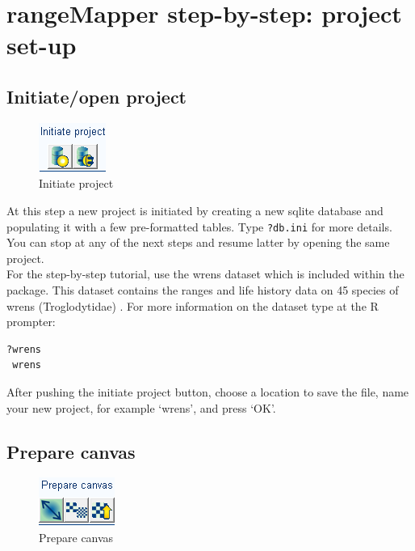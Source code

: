 \documentclass[ a4paper ]{article}
\newenvironment{Rcode}
{\begin{list}{}{\setlength{\leftmargin}{1em}}\item\scriptsize\bfseries}
{\end{list}}
\begin{document}
 \pagebreak	
\section{rangeMapper step-by-step: project set-up}
	\subsection{Initiate/open project}

	\begin{figure}[htbp]
	  \begin{center}
		\includegraphics[width=0.2\linewidth]{fig3}
		\caption{\label{fig:fig3} Initiate project}
	  \end{center}
	\end{figure}

	At this step a new project is initiated by creating a new sqlite database and populating it with a few pre-formatted tables. 
	Type \texttt{?db.ini} for more details. You can stop at any of the next steps and resume latter by opening the same project.
	\\
	For the step-by-step tutorial, use the wrens dataset which is included within the package. This dataset contains the ranges and life history data on 45 species of wrens (Troglodytidae) \cite{ridgely07}. 
For more information on the dataset type at the R prompter:

\begin{Rcode}\begin{verbatim}
?wrens 
 wrens
\end{verbatim}\end{Rcode}
After pushing the initiate project button, choose a location to save the file, name your new project, for example `wrens', and press `OK'.

\subsection{Prepare canvas}
	
	\begin{figure}[htbp]
	  \begin{center}
		\includegraphics[width=0.2\linewidth]{fig4}
		\caption{\label{fig:fig4} Prepare canvas}
	  \end{center}
	\end{figure}
	
\end{document}
